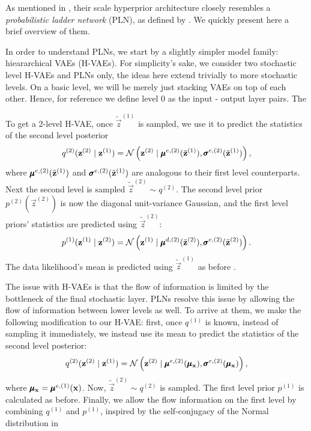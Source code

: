 \par
As mentioned in \cite{balle2018variational}, their scale hyperprior architecture
closely resembles a \textit{probabilistic ladder network} (PLN), as defined by
\cite{sonderby2016train}. We quickly present here a brief overview of them.
\par
In order to understand PLNs, we start by a slightly simpler model family:
hieararchical VAEs (H-VAEs). For simplicity's sake, we consider two stochastic
level H-VAEs and PLNs only, the ideas here extend trivially to more stochastic levels.
On a basic level, we will be merely just stacking VAEs on top of each other.
Hence, for reference we define level 0 as the input - output layer pairs. The
\par
To get a 2-level H-VAE, once $\tilde{\vec{z}}^{(1)}$ is sampled, we use it to predict
the statistics of the second level posterior
\[
  q^{(2)}(\mathbf{z}^{(2)} \mid \mathbf{z}^{(1)}) = \mathcal{N}\left( \mathbf{z}^{(2)} \mid 
  \pmb{\mu}^{e, (2)}(\tilde{\mathbf{z}}^{(1)}), \pmb{\sigma}^{e, (2)}(\tilde{\mathbf{z}}^{(1)}) \right),
\]
where $\pmb{\mu}^{e, (2)}(\tilde{\mathbf{z}}^{(1)})$ and
$\pmb{\sigma}^{e, (2)}(\tilde{\mathbf{z}}^{(1)})$ are analogous to their first level
counterparts. Next the second level is sampled $\tilde{\vec{z}}^{(2)} \sim
q^{(2)}$. The second level prior $p^{(2)}(\vec{z}^{(2)})$ is now the diagonal
unit-variance Gaussian, and the first level priors' statistics are predicted
using $\tilde{\vec{z}}^{(2)}$:
\[
  p^{(1)}(\mathbf{z}^{(1)} \mid \mathbf{z}^{(2)}) =
  \mathcal{N}\left( \mathbf{z}^{(1)} \mid \pmb{\mu}^{d, (2)}(\tilde{\mathbf{z}}^{(2)}),
    \pmb{\sigma}^{e, (2)}(\tilde{\mathbf{z}}^{(2)}) \right).
\] 
The data likelihood's mean is predicted using $\tilde{\vec{z}}^{(1)}$ as before
\cite{sonderby2016train}.
\par
The issue with H-VAEs is that the flow of information is limited by the
bottleneck of the final stochastic layer. PLNs resolve this issue by allowing
the flow of information between lower levels as well. To arrive at them, we
make the following modification to our H-VAE: first, once $q^{(1)}$ is known,
instead of sampling it immediately, we instead use its mean to predict the
statistics of the second level posterior:
\[
  q^{(2)}(\mathbf{z}^{(2)} \mid \mathbf{z}^{(1)}) = \mathcal{N}\left( \mathbf{z}^{(2)} \mid 
  \pmb{\mu}^{e, (2)}(\pmb{\mu}_{\mathbf{x}}), \pmb{\sigma}^{e, (2)}(\pmb{\mu}_{\mathbf{x}}) \right),
\]
where $\pmb{\mu}_{\mathbf{x}} = \pmb{\mu}^{e, (1)}(\mathbf{x})$. Now, $\tilde{\vec{z}}^{(2)} \sim
q^{(2)}$ is sampled. The first level prior $p^{(1)}$ is calculated as before.
Finally, we allow the flow information on the first level by combining $q^{(1)}$
and $p^{(1)}$, inspired by the self-conjugacy of the Normal distribution in
